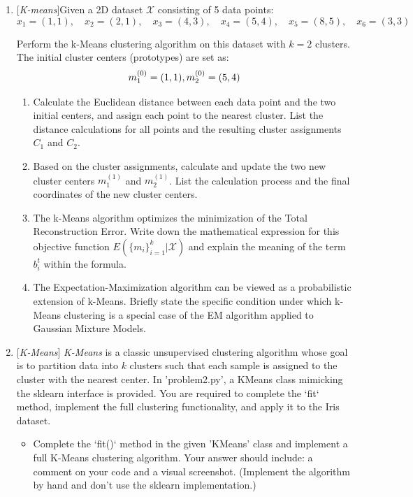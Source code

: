 \documentclass[10pt]{article}
\begin{document}
\begin{enumerate}
\item {} [\textit{K-means}]Given a 2D dataset $\mathcal{X}$ consisting of 5 data points:
$$
x_1=(1, 1), \quad x_2=(2, 1), \quad x_3=(4, 3), \quad x_4=(5, 4), \quad x_5=(8, 5), \quad x_6=(3,3)
$$

Perform the k-Means clustering algorithm on this dataset with $k=2$ clusters. The initial cluster centers (prototypes) are set as:
$$
m_1^{(0)}=(1, 1), \quad \\
m_2^{(0)}=(5, 4)
$$

\begin{enumerate}
    \item Calculate the Euclidean distance between each data point and the two initial centers, and assign each point to the nearest cluster. List the distance calculations for all points and the resulting cluster assignments $C_1$ and $C_2$. 
    
    \item Based on the cluster assignments, calculate and update the two new cluster centers $m_1^{(1)}$ and $m_2^{(1)}$. List the calculation process and the final coordinates of the new cluster centers.

    \item The k-Means algorithm optimizes the minimization of the Total Reconstruction Error. Write down the mathematical expression for this objective function $E(\{m_i\}_{i=1}^{k} | \mathcal{X})$ and explain the meaning of the term $b_i^t$ within the formula.

    \item The Expectation-Maximization algorithm can be viewed as a probabilistic extension of k-Means. Briefly state the specific condition under which k-Means clustering is a special case of the EM algorithm applied to Gaussian Mixture Models.

\end{enumerate}

\newpage


\newpage

\item {} {[}\textit{K-Means}{]} \textit{K-Means} is a classic unsupervised clustering algorithm whose goal is to partition data into $k$ clusters such that each sample is assigned to the cluster with the nearest center.  In 'problem2.py', a KMeans class mimicking the sklearn interface is provided.  You are required to complete the `fit` method, implement the full clustering functionality, and apply it to the Iris dataset.
\begin{itemize}
	\item[(a)] Complete the `fit()` method in the given 'KMeans' class and implement a full K-Means clustering algorithm. Your answer should include: a comment on your code and a visual screenshot. (Implement the algorithm by hand and don't use the sklearn implementation.) 
    

\end{itemize}
\end{enumerate}
\end{document}
